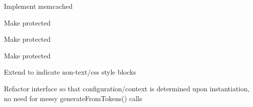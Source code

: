 \begin{DoxyRefList}
Implement memcached  
\item[\label{todo__todo000039}%
\hypertarget{todo__todo000039}{}%
Global \hyperlink{class_h_t_m_l_purifier___definition_cache___serializer_aee241262476502b57468824014d2cd9c}{H\-T\-M\-L\-Purifier\-\_\-\-Definition\-Cache\-\_\-\-Serializer\-:\-:generate\-Base\-Directory\-Path} (\$config)]Make protected  
\item[\label{todo__todo000038}%
\hypertarget{todo__todo000038}{}%
Global \hyperlink{class_h_t_m_l_purifier___definition_cache___serializer_a7fff077e6b81bdf2086b4dc4173622ab}{H\-T\-M\-L\-Purifier\-\_\-\-Definition\-Cache\-\_\-\-Serializer\-:\-:generate\-Directory\-Path} (\$config)]Make protected  
\item[\label{todo__todo000037}%
\hypertarget{todo__todo000037}{}%
Global \hyperlink{class_h_t_m_l_purifier___definition_cache___serializer_a909ba3514cc35be26f2dafd0350569a3}{H\-T\-M\-L\-Purifier\-\_\-\-Definition\-Cache\-\_\-\-Serializer\-:\-:generate\-File\-Path} (\$config)]Make protected  
\item[\label{todo__todo000041}%
\hypertarget{todo__todo000041}{}%
Global \hyperlink{class_h_t_m_l_purifier___filter___extract_style_blocks_a2e252192737a302a8e876af072bd1702}{H\-T\-M\-L\-Purifier\-\_\-\-Filter\-\_\-\-Extract\-Style\-Blocks\-:\-:pre\-Filter} (\$html, \$config, \$context)]Extend to indicate non-\/text/css style blocks  
\item[\label{todo__todo000042}%
\hypertarget{todo__todo000042}{}%
Class \hyperlink{class_h_t_m_l_purifier___generator}{H\-T\-M\-L\-Purifier\-\_\-\-Generator} ]Refactor interface so that configuration/context is determined upon instantiation, no need for messy generate\-From\-Tokens() calls 


\end{DoxyRefList}
